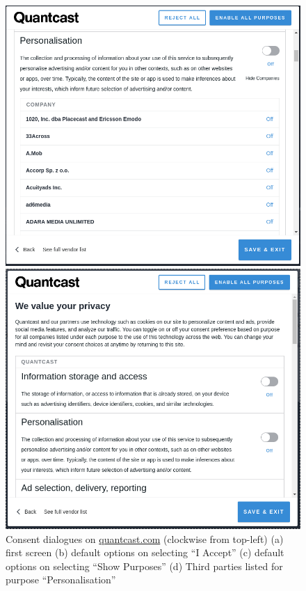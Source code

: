 \begin{figure}[htbp]
\begin{minipage}[b]{0.5\linewidth}
        \centering
        \includegraphics[width=\linewidth]{img/quantcast_third_parties.png}
    \end{minipage}
    \begin{minipage}[b]{0.5\linewidth}
        \centering
        \includegraphics[width=\linewidth]{img/quantcast_consent_info.png}
    \end{minipage}
    \caption{Consent dialogues on \url{quantcast.com} (clockwise from top-left) (a) first screen (b) default options on selecting “I Accept” (c) default options on selecting “Show Purposes” (d) Third parties listed for purpose “Personalisation”}
    \label{fig:shacl:quantcast-consent-dialogue}
\end{figure}

